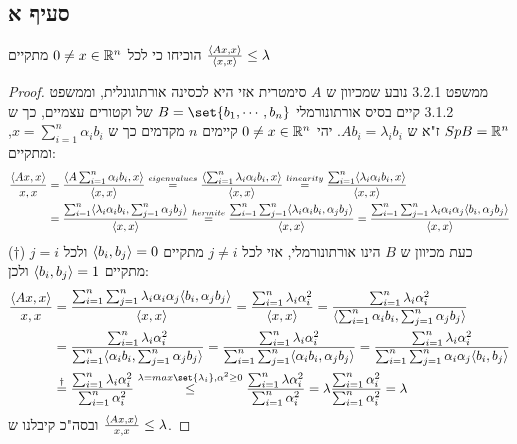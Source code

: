 \documentclass{article}
\DeclarePairedDelimiter\set\{\}
\begin{document}
	\subsection*{סעיף א}
	הוכיחו כי לכל $0 \neq x \in \mathbb{R}^n$ מתקיים $\frac{\langle Ax, x \rangle}{\langle x,x \rangle} \leq \lambda$
	\begin{proof}
		ממשפט 3.2.1 נובע שמכיוון ש $A$ סימטרית אזי היא לכסינה אורתוגונלית, וממשפט 3.1.2 קיים בסיס אורתונורמלי $B = \set{b_1, \cdots, b_n}$ של וקטורים עצמיים, כך ש $Sp B = \mathbb{R}^n$
		ז"א ש $Ab_i = \lambda_i b_i$.
		יהי $0 \neq x \in \mathbb{R}^n$ קיימים $n$ מקדמים כך ש $x = \sum_{i=1}^n \alpha_i b_i$, ומתקיים:
		\begin{align*}
			\frac{\langle Ax, x \rangle}{x,x}
			&= \frac{\langle A\sum_{i=1}^n \alpha_i b_i, x  \rangle}{\langle x,x \rangle}
			\overset{eigenvalues}= \frac{\langle \sum_{i=1}^n \lambda_i\alpha_i b_i, x  \rangle}{\langle x,x \rangle}
			\overset{linearity}= \frac{\sum_{i=1}^n \langle  \lambda_i\alpha_i b_i, x \rangle}{\langle x,x \rangle} \\
			&= \frac{\sum_{i=1}^n \langle  \lambda_i\alpha_i b_i, \sum_{j=1}^n \alpha_j b_j \rangle}{\langle x,x \rangle}
			\overset{hermite}= \frac{\sum_{i=1}^n \sum_{j=1}^n \langle  \lambda_i\alpha_i b_i,  \alpha_j b_j \rangle}{\langle x,x \rangle}
			= \frac{\sum_{i=1}^n \sum_{j=1}^n \lambda_i\alpha_i\alpha_j\langle b_i , \alpha_j b_j \rangle}{\langle x,x \rangle}
		\end{align*}
		($\dagger$)	כעת מכיוון ש $B$ הינו אורתונורמלי, אזי לכל $j \neq i$ מתקיים $\langle b_i, b_j \rangle = 0$ ולכל $j=i$ מתקיים $\langle b_i, b_j \rangle = 1$ ולכן:
		\begin{align*}
			\frac{\ang{Ax, x}}{x,x}
			&= \frac{\sum_{i=1}^n \sum_{j=1}^n \lambda_i\alpha_i\alpha_j\ang{b_i , \alpha_j b_j}}{\ang{x,x}}
			= \frac{\sum_{i=1}^n \lambda_i\alpha_i^2}{\ang{x,x}}
			= \frac{\sum_{i=1}^n \lambda_i\alpha_i^2}{\ang{\sum_{i=1}^n \alpha_i b_i,\sum_{j=1}^n \alpha_j b_j}} \\
			&= \frac{\sum_{i=1}^n \lambda_i\alpha_i^2}{\sum_{i=1}^n\ang{\alpha_i b_i,\sum_{j=1}^n \alpha_j b_j}}
			= \frac{\sum_{i=1}^n \lambda_i\alpha_i^2}{\sum_{i=1}^n\sum_{j=1}^n\ang{\alpha_i b_i, \alpha_j b_j}}
			= \frac{\sum_{i=1}^n \lambda_i\alpha_i^2}{\sum_{i=1}^n\sum_{j=1}^n\alpha_i \alpha_j \ang{ b_i,  b_j}} \\
			&\overset{\dagger}= \frac{\sum_{i=1}^n \lambda_i\alpha_i^2}{\sum_{i=1}^n\alpha_i^2}
			\overset{\lambda = max\set{\lambda_i}, \alpha^2 \geq 0}\leq  \frac{\sum_{i=1}^n \lambda\alpha_i^2}{\sum_{i=1}^n\alpha_i^2}
			=  \lambda\frac{\sum_{i=1}^n \alpha_i^2}{\sum_{i=1}^n\alpha_i^2}
			=  \lambda
		\end{align*}
		ובסה"כ קיבלנו ש $\frac{\langle Ax, x \rangle}{x,x} \leq \lambda$.
	\end{proof}
\end{document}
